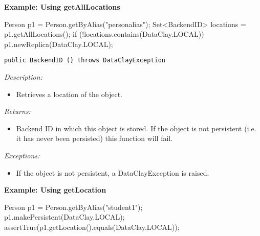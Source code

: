\begin{tBox}
\textcolor{basecolor} {\bf Example: Using getAllLocations}
\begin{java}
Person p1 = Person.getByAlias("personalias");
Set<BackendID> locations = p1.getAllLocations();
if (!locations.contains(DataClay.LOCAL)) {
 p1.newReplica(DataClay.LOCAL);
}
\end{java}
\end{tBox}



\begin{dBox}
\texttt{public BackendID () throws DataClayException}
\LINE

{\it Description:}

\begin{itemize}
    \item Retrieves a location of the object. %
\end{itemize}
 
{\it Returns:}

\begin{itemize}
    \item Backend ID in which this object is stored. If the object is not persistent (i.e. it has never been persisted) this function will fail.
\end{itemize}

{\it Exceptions:}

\begin{itemize}
    \item If the object is not persistent, a DataClayException is raised.
\end{itemize}

\end{dBox}

\begin{tBox}
\textcolor{basecolor} {\bf Example: Using getLocation}
\begin{java}
Person p1 = Person.getByAlias("student1");
p1.makePersistent(DataClay.LOCAL);
assertTrue(p1.getLocation().equals(DataClay.LOCAL));
\end{java}
\end{tBox}



